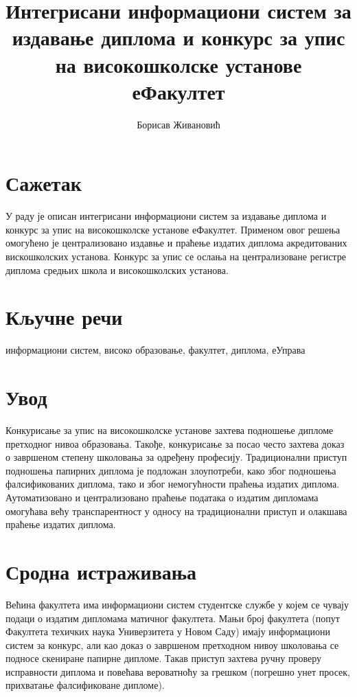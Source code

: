 \documentclass[a4paper]{article}
\title{Интегрисани информациони систем за издавање диплома и конкурс за упис на високошколске установе еФакултет}
\author{Борисав Живановић}
\begin{document}
\maketitle

\large

\section*{Сажетак}

У раду \cite{texbook} је описан интегрисани информациони систем за издавање диплома и конкурс за упис на високошколске установе еФакултет.
Применом овог решења омогућено је централизовано издавње и праћење издатих диплома акредитованих вискошколских установа.
Конкурс за упис се ослања на централизоване регистре диплома средњих школа и високошколских установа.

\section*{Кључне речи}

информациони систем, високо образовање, факултет, диплома, еУправа

\section*{Увод}

Конкурисање за упис на високошколске установе захтева подношење дипломе претходног нивоа образовања.
Такође, конкурисање за посао често захтева доказ о завршеном степену школовања за одређену професију.
Традиционални приступ подношења папирних диплома је подложан злоупотреби, како због подношења фалсификованих диплома,
тако и због немогућности праћења издатих диплома. Аутоматизовано и централизовано праћење података о издатим дипломама
омогућава већу транспарентност у односу на традиционални приступ и олакшава праћење издатих диплома.

\section*{Сродна истраживања}

Већина факултета има информациони систем студентске службе у којем се чувају подаци о издатим дипломама матичног факултета.
Мањи број факултета (попут Факултета техичких наука Универзитета у Новом Саду) имају информациони систем за конкурс, али
као доказ о завршеном претходном нивоу школовања се подносе скениране папирне дипломе. Такав приступ захтева ручну проверу
исправности диплома и повећава вероватноћу за грешком (погрешно унет просек, прихватање фалсификоване дипломе).
\end{document}
